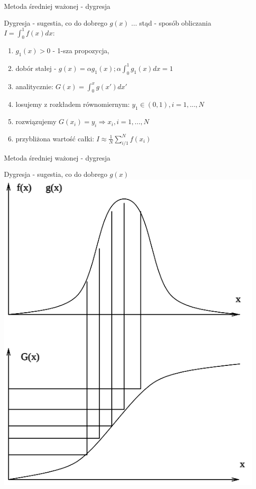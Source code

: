 \begin{frame}{Metoda średniej ważonej - dygresja}
	\begin{block}{Dygresja - sugestia, co do dobrego $g(x)$}
    	... stąd - sposób obliczania $I = \int_0^1 f(x) dx$:
        \begin{enumerate}
        	\item $g_1(x) > 0$ - 1-sza propozycja,
            \item dobór stałej - $g(x) = \alpha g_1(x); \alpha \int_0^1 g_1(x) dx = 1$
            \item analitycznie: $G(x) = \int_0^x g(x') dx'$
            \item losujemy z rozkładem równomiernym: $y_1 \in (0, 1), i = 1, ..., N$
            \item rozwiązujemy $G(x_i) = y_i \Rightarrow x_i, i = 1, ..., N$
            \item przybliżona wartość całki: $I \approx \frac{1}{N} \sum_{i/1}^N f(x_i)$
        \end{enumerate}
	\end{block}
\end{frame}
\begin{frame}{Metoda średniej ważonej - dygresja}
	\begin{block}{Dygresja - sugestia, co do dobrego $g(x)$}
    	\centering \includegraphics[width=.4\linewidth]{img/15/15_2_dobre_gx}
	\end{block}
\end{frame}